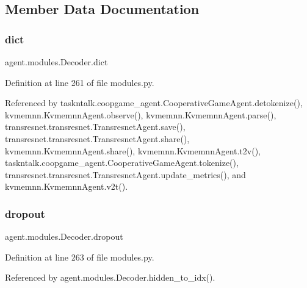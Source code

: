 \subsection{Member Data Documentation}
\mbox{\label{classagent_1_1modules_1_1Decoder_afa32bb09dc45397ab9ec963a6dd54cb7}} 
\subsubsection{\texorpdfstring{dict}{dict}}
{\footnotesize\ttfamily agent.\+modules.\+Decoder.\+dict}



Definition at line 261 of file modules.\+py.



Referenced by taskntalk.\+coopgame\+\_\+agent.\+Cooperative\+Game\+Agent.\+detokenize(), kvmemnn.\+Kvmemnn\+Agent.\+observe(), kvmemnn.\+Kvmemnn\+Agent.\+parse(), transresnet.\+transresnet.\+Transresnet\+Agent.\+save(), transresnet.\+transresnet.\+Transresnet\+Agent.\+share(), kvmemnn.\+Kvmemnn\+Agent.\+share(), kvmemnn.\+Kvmemnn\+Agent.\+t2v(), taskntalk.\+coopgame\+\_\+agent.\+Cooperative\+Game\+Agent.\+tokenize(), transresnet.\+transresnet.\+Transresnet\+Agent.\+update\+\_\+metrics(), and kvmemnn.\+Kvmemnn\+Agent.\+v2t().

\mbox{\label{classagent_1_1modules_1_1Decoder_a9924bcfb8e8bd2c76f9d359d55df8c6b}} 
\subsubsection{\texorpdfstring{dropout}{dropout}}
{\footnotesize\ttfamily agent.\+modules.\+Decoder.\+dropout}



Definition at line 263 of file modules.\+py.



Referenced by agent.\+modules.\+Decoder.\+hidden\+\_\+to\+\_\+idx().

\mbox{\label{classagent_1_1modules_1_1Decoder_acb96c900ec5ab64a366846e9e88ba7e8}} 
